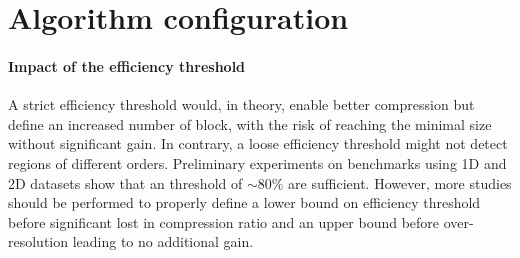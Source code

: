 \documentclass[conference]{IEEEtran}
\theoremstyle{remark}
\begin{document}
\section{Algorithm configuration}
\paragraph{Impact of the efficiency threshold}
A strict efficiency threshold would, in theory, enable better compression but define an increased number of block, with the risk of reaching the minimal size without significant gain. In contrary, a loose efficiency threshold might not detect regions of different orders.
Preliminary experiments on benchmarks using 1D and 2D datasets show that an threshold of $\sim80\%$ are sufficient.
However, more studies should be performed to properly define a lower bound on efficiency threshold before significant lost in compression ratio and an upper bound before over-resolution leading to no additional gain.

\end{document}

